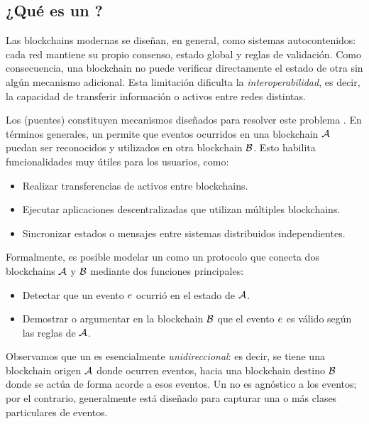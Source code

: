 
\subsection{¿Qué es un \Bridge?}
\label{subsec:bridges-que-es-un-bridge}

Las blockchains modernas se diseñan, en general, como sistemas autocontenidos: cada red mantiene su propio consenso, estado global y reglas de validación. Como consecuencia, una blockchain no puede verificar directamente el estado de otra sin algún mecanismo adicional. Esta limitación dificulta la \emph{interoperabilidad}, es decir, la capacidad de transferir información o activos entre redes distintas.

Los \Bridges (puentes) constituyen mecanismos diseñados para resolver este problema \cite{Belchior2021}. En términos generales, un \Bridge permite que eventos ocurridos en una blockchain $\mathcal{A}$ puedan ser reconocidos y utilizados en otra blockchain $\mathcal{B}$. Esto habilita funcionalidades muy útiles para los usuarios, como:
\begin{itemize}[noitemsep]
	\item Realizar transferencias de activos entre blockchains.
	\item Ejecutar aplicaciones descentralizadas que utilizan múltiples blockchains.
	\item Sincronizar estados o mensajes entre sistemas distribuidos independientes.
\end{itemize}

Formalmente, es posible modelar un \Bridge como un protocolo que conecta dos blockchains $\mathcal{A}$ y $\mathcal{B}$ mediante dos funciones principales:
\begin{itemize}[noitemsep]
	\item Detectar que un evento $e$ ocurrió en el estado de $\mathcal{A}$.
	\item Demostrar o argumentar en la blockchain $\mathcal{B}$ que el evento $e$ es válido según las reglas de $\mathcal{A}$.
\end{itemize}

Observamos que un \Bridge es esencialmente \emph{unidireccional}: es decir, se tiene una blockchain origen $\mathcal{A}$ donde ocurren eventos, hacia una blockchain destino $\mathcal{B}$ donde se actúa de forma acorde a esos eventos. Un \Bridge no es agnóstico a los eventos; por el contrario, generalmente está diseñado para capturar una o más clases particulares de eventos.

